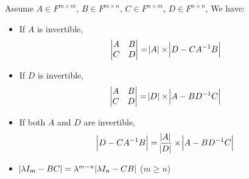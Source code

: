 \begin{theorem}
    Assume $A \in F^{m \times m}$, $B \in F^{m \times n}$, $C \in F^{n \times m}$, $D \in F^{n \times n}$, We have:
    \begin{itemize}
        \item If $A$ is invertible, \begin{equation}
            \begin{vmatrix}
                A & B \\
                C & D
                \end{vmatrix} = \abs{A} \times \abs{D - C {A}^{-1} B}
        \end{equation}
    \item If $D$ is invertible, \begin{equation}
            \begin{vmatrix}
                A & B \\
                C & D
                \end{vmatrix} = \abs{D} \times \abs{A - B {D}^{-1} C}
        \end{equation}
    \item If both $A$ and $D$ are invertible, \begin{equation}
        \abs{D - C {A}^{-1} B} = \frac{\abs{A}}{\abs{D}} \times \abs{A - B {D}^{-1} C}
        \end{equation}
    \item $\abs{\lambda I_m - BC} =\lambda^{m-n} \abs{\lambda I_n - CB}$ ($m \geq n$)
    \end{itemize}
\end{theorem}


